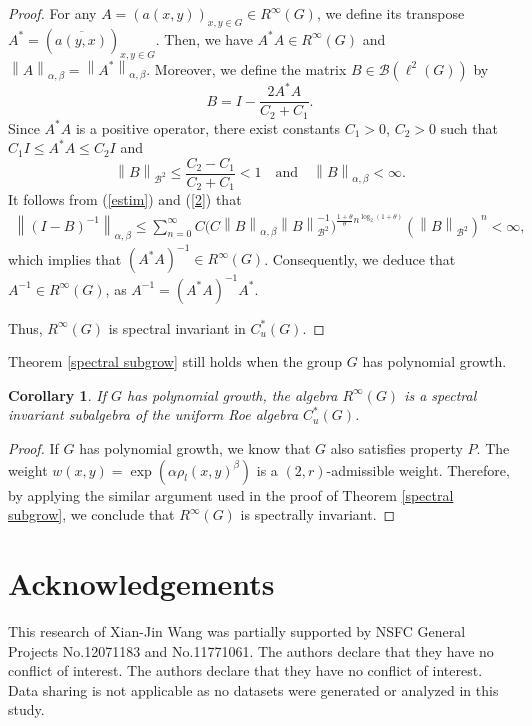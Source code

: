 \documentclass[preprint,11pt]{elsarticle}
\newtheorem{corollary}{Corollary}[section]
\numberwithin{equation}{section}
\begin{document}
\begin{proof}
		For any $A=(a(x,y))_{x,y\in G}\in  R^{\infty }(G)$, we define its transpose $A^{*}=(\overline{a(y,x)} )_{x,y\in G}$. Then, we have $A^{*}A\in  R^{\infty }(G)$ and  $\left \| A \right \|_{\alpha,\beta }= \left \| A^{*} \right \|_{\alpha,\beta }$. 
		\noindent Moreover, we define the matrix $B\in \mathcal{B} (\ell^{2}(G))$ by 
		$$	B=I-\frac{2 A^{*}A}{C_2+C_1 }.$$
		Since $A^{*}A$ is a positive operator, there exist constants $C_1>0$, $C_2>0$ such that $C_{1}I\le A^{*}A\le C_{2}I$ and
		\begin{equation}\label{2}
			\left \| B \right \|_{\mathcal{B} ^{2}}\le\frac{C_2-C_1}{ C_2+C_1} <1  \quad \text{and}\quad  \left \| B \right \|_{\alpha,\beta }<\infty.
		\end{equation}
		It follows from (\ref{estim}) and (\ref{2}) that  
		\begin{align*}
			\left \|( I-B)^{-1} \right \|_{\alpha,\beta } %
			\le \sum_{n=0}^{\infty} C\Big ( C\left \| B \right \|_{\alpha,\beta } \left \| B \right \|_{\mathcal{B}^{2}}^{-1} \Big  )^{\frac{1+\theta }{\theta }n^{\log_{2}{(1+\theta )} } } (\left \| B \right \|_{\mathcal{B}^{2}}) ^{n}<\infty ,
		\end{align*}
		which implies that $(A^{*}A)^{-1}\in R^{\infty}(G)$.
		Consequently, we deduce that $A^{-1}\in  R^{\infty }(G)$, as $A^{-1}=(A^{*}A)^{-1}A^{*}$.\par
		Thus, $ R^{\infty }(G)$ is spectral invariant in $C_{u}^{*}  \left ( G \right )$.
	\end{proof}
	Theorem \ref{spectral subgrow} still holds when the group $
	G$ has polynomial growth.
	\begin{corollary}
		If $G$ has polynomial growth, the algebra $ R^{\infty }(G)$ is a spectral invariant  subalgebra of the uniform Roe algebra $C_{u}^{*}(G)$.
	\end{corollary}
	\begin{proof}
		If $G$ has polynomial growth, we know that $G$ also satisfies property $P$. The weight $w(x,y)=\exp(\alpha \rho_{l }(x,y)^{\beta})$ is a $(2,r)$-admissible weight.
		Therefore, by applying the similar argument used in the proof of Theorem \ref{spectral subgrow}, we conclude that $ R^{\infty }(G)$ is spectrally invariant.
	\end{proof}
	
	\section*{Acknowledgements}
	This research of Xian-Jin Wang was partially supported by NSFC General  Projects No.12071183 and No.11771061. 
	The authors declare that they have no conflict of interest.
	The authors declare that they have no conflict of interest. Data sharing is not applicable as no datasets were generated or analyzed in this study.
	
	
		
\end{document}

